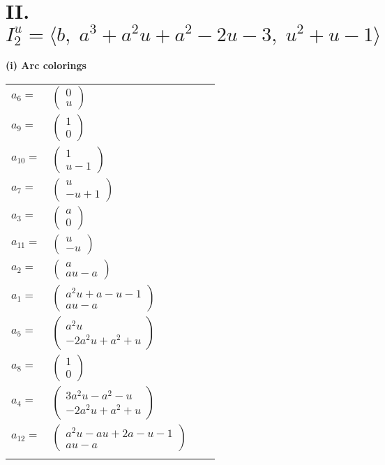 \documentclass[1p]{elsarticle_modified}
\theoremstyle{definition}
\begin{document}
\centering \section*{II. $I^u_{2}= \langle b,\;a^3+a^2 u+a^2-2 u-3,\;u^2+u-1 \rangle$}
\flushleft \textbf{(i) Arc colorings}\\
\begin{tabular}{m{7pt} m{180pt} m{7pt} m{180pt} }
\flushright $a_{6}=$&$\begin{pmatrix}0\\u\end{pmatrix}$ \\
\flushright $a_{9}=$&$\begin{pmatrix}1\\0\end{pmatrix}$ \\
\flushright $a_{10}=$&$\begin{pmatrix}1\\u-1\end{pmatrix}$ \\
\flushright $a_{7}=$&$\begin{pmatrix}u\\- u+1\end{pmatrix}$ \\
\flushright $a_{3}=$&$\begin{pmatrix}a\\0\end{pmatrix}$ \\
\flushright $a_{11}=$&$\begin{pmatrix}u\\- u\end{pmatrix}$ \\
\flushright $a_{2}=$&$\begin{pmatrix}a\\a u- a\end{pmatrix}$ \\
\flushright $a_{1}=$&$\begin{pmatrix}a^2 u+a- u-1\\a u- a\end{pmatrix}$ \\
\flushright $a_{5}=$&$\begin{pmatrix}a^2 u\\-2 a^2 u+a^2+u\end{pmatrix}$ \\
\flushright $a_{8}=$&$\begin{pmatrix}1\\0\end{pmatrix}$ \\
\flushright $a_{4}=$&$\begin{pmatrix}3 a^2 u- a^2- u\\-2 a^2 u+a^2+u\end{pmatrix}$ \\
\flushright $a_{12}=$&$\begin{pmatrix}a^2 u- a u+2 a- u-1\\a u- a\end{pmatrix}$\\&\end{tabular}
\end{document}
